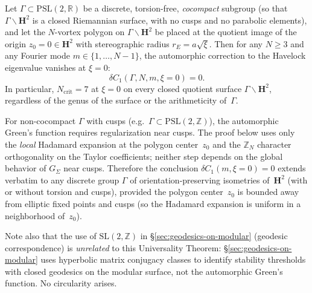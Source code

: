 \begin{theorem}[Universality of $N_{\mathrm{crit}} = 7$]
\label{thm:universality}
Let $\Gamma \subset \mathrm{PSL}(2,\mathbb{R})$ be a discrete,
torsion-free, \emph{cocompact} subgroup (so that $\Gamma
\backslash \mathbf{H}^2$ is a closed Riemannian surface,
with no cusps and no parabolic elements), and let the
$N$-vortex polygon on $\Gamma\backslash\mathbf{H}^2$ be
placed at the quotient image of the origin $z_0 = 0 \in
\mathbf{H}^2$ with stereographic radius $r_E = a\sqrt{\xi}$.
Then for any $N \ge 3$ and any Fourier mode
$m \in \{1, \ldots, N{-}1\}$, the automorphic correction
to the Havelock eigenvalue vanishes at $\xi = 0$:
\[
  \delta C_1(\Gamma, N, m, \xi{=}0) = 0.
\]
In particular, $N_{\mathrm{crit}} = 7$ at $\xi = 0$ on every
closed quotient surface $\Gamma\backslash\mathbf{H}^2$,
regardless of the genus of the surface or the arithmeticity
of~$\Gamma$.
\end{theorem}

\begin{remark}
\label{rmk:non-cocompact}
For non-cocompact $\Gamma$ with cusps (e.g.\
$\Gamma \subset \mathrm{PSL}(2,\mathbb{Z})$), the automorphic
Green's function requires regularization near cusps.
The proof below uses only the \emph{local} Hadamard expansion
at the polygon center~$z_0$ and the $\mathbb{Z}_N$ character
orthogonality on the Taylor coefficients; neither step
depends on the global behavior of $G_\Sigma$ near cusps.
Therefore the conclusion $\delta C_1(m, \xi = 0) = 0$ extends
verbatim to any discrete group $\Gamma$ of orientation-preserving
isometries of~$\mathbf{H}^2$ (with or without torsion and cusps),
provided the polygon center~$z_0$ is bounded away from elliptic
fixed points and cusps (so the Hadamard expansion is uniform
in a neighborhood of~$z_0$).

Note also that the use of $\mathrm{SL}(2,\mathbb{Z})$ in
\S\ref{sec:geodesics-on-modular} (geodesic correspondence)
is \emph{unrelated} to this Universality Theorem:
\S\ref{sec:geodesics-on-modular} uses hyperbolic matrix
conjugacy classes to identify stability thresholds with
closed geodesics on the modular surface, not the
automorphic Green's function.  No circularity arises.
\end{remark}

